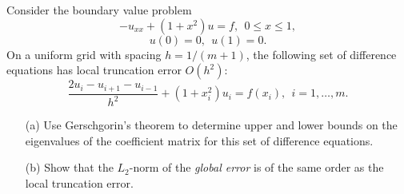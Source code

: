 \documentclass[10pt]{article}
\begin{document}
\begin{problem}
Consider the boundary value problem
\[
- u_{xx} + ( 1 + x^2 ) u = f ,~~0 \leq x \leq 1 ,
\]
\[
u(0) = 0 ,~~u(1) = 0.
\]
On a uniform grid with spacing \(h = 1/(m+1)\), the following set of difference equations
has local truncation error \(O( h^2 )\):
\[
\frac{2 u_i - u_{i+1} - u_{i-1}}{h^2} + (1 + x_i^2 ) u_i = f( x_i ) ,~~i=1, \ldots , m .
\]
\begin{enumerate}
    \item[(a)] Use Gerschgorin's theorem to determine upper and lower bounds on the eigenvalues of the coefficient matrix for this set of difference equations.
    \item[(b)] Show that the \(L_2\)-norm of the {\em global error} is of the same order as the local truncation error.
\end{enumerate}
\end{problem}
\end{document}
